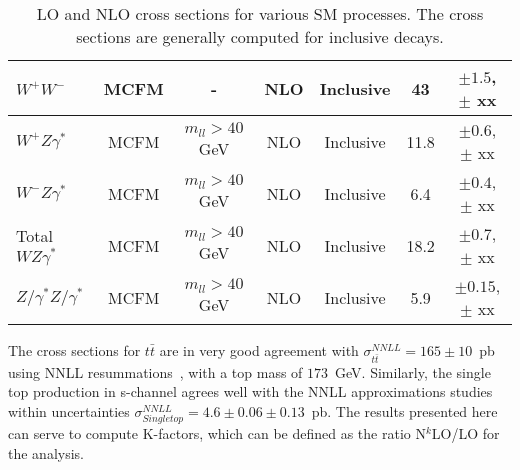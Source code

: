 \begin{table}[hbt]
\begin{center}
\begin{tabular}{|l|c|c|c|c|c|c|}
$W^+W^-$ & MCFM & - & NLO & Inclusive & 43 & $\pm 1.5$, $\pm$ xx \\ \hline
$W^+Z\gamma^*$ & MCFM & $m_{ll} > 40$ GeV & NLO & Inclusive & 11.8 & $\pm 0.6$, $\pm$ xx \\ \hline
$W^-Z\gamma^*$ & MCFM & $m_{ll} > 40$ GeV & NLO & Inclusive & 6.4 & $\pm 0.4$, $\pm$ xx \\ \hline
Total $WZ\gamma^*$ & MCFM & $m_{ll} > 40$ GeV & NLO & Inclusive & 18.2 & $\pm 0.7$, $\pm$ xx \\ \hline
$Z/\gamma^*Z/\gamma^*$ & MCFM & $m_{ll} > 40$ GeV & NLO & Inclusive & 5.9 & $\pm 0.15$, $\pm$ xx \\ \hline
\end{tabular} 
\caption{LO and NLO cross sections for various SM processes. The cross sections are generally
computed for inclusive decays. \label{tab:nlo}}
\end{center}
\end{table}

The cross sections for $t\bar{t}$ are in very good agreement with 
$\sigma^{NNLL}_{t\bar{t}} = 165 \pm 10$~pb using NNLL 
resummations~\cite{nnllttbar}, with a top mass of $173$~GeV. Similarly, the 
single top production in s-channel agrees well with the NNLL approximations 
studies~\cite{nnllschannel} within uncertainties 
$\sigma^{NNLL}_{Single top} = 4.6 \pm 0.06 \pm 0.13$~pb. The results presented 
here can serve to compute K-factors, which can be defined as the ratio 
N$^k$LO/LO for the analysis.
